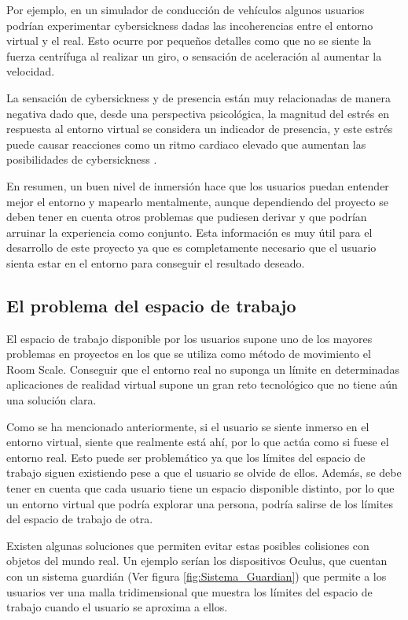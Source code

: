 \documentclass[../main.tex]{subfiles}
\begin{document}
Por ejemplo, en un simulador de conducción de vehículos algunos usuarios podrían experimentar cybersickness dadas las incoherencias entre el entorno virtual y el real. Esto ocurre por pequeños detalles como que no se siente la fuerza centrífuga al realizar un giro, o sensación de aceleración al aumentar la velocidad.

La sensación de cybersickness y de presencia están muy relacionadas de manera negativa dado que, desde una perspectiva psicológica, la magnitud del estrés en respuesta al entorno virtual se considera un indicador de presencia, y este estrés puede causar reacciones como un ritmo cardiaco elevado que aumentan las posibilidades de cybersickness \cite{Cybersickness}.

En resumen, un buen nivel de inmersión hace que los usuarios puedan entender mejor el entorno y mapearlo mentalmente, aunque dependiendo del proyecto se deben tener en cuenta otros problemas que pudiesen derivar y que podrían arruinar la experiencia como conjunto. Esta información es muy útil para el desarrollo de este proyecto ya que es completamente necesario que el usuario sienta estar en el entorno para conseguir el resultado deseado. 

\subsection{El problema del espacio de trabajo} \label{Workspace_Problem}

El espacio de trabajo disponible por los usuarios supone uno de los mayores problemas en proyectos en los que se utiliza como método de movimiento el Room Scale. Conseguir que el entorno real no suponga un límite en determinadas aplicaciones de realidad virtual supone un gran reto tecnológico que no tiene aún una solución clara.

Como se ha mencionado anteriormente, si el usuario se siente inmerso en el entorno virtual, siente que realmente está ahí, por lo que actúa como si fuese el entorno real. Esto puede ser problemático ya que los límites del espacio de trabajo siguen existiendo pese a que el usuario se olvide de ellos. Además, se debe tener en cuenta que cada usuario tiene un espacio disponible distinto, por lo que un entorno virtual que podría explorar una persona, podría salirse de los límites del espacio de trabajo de otra.

Existen algunas soluciones que permiten evitar estas posibles colisiones con objetos del mundo real. Un ejemplo serían los dispositivos Oculus, que cuentan con un sistema guardián (Ver figura \ref{fig:Sistema_Guardian}) que permite a los usuarios ver una malla tridimensional que muestra los límites del espacio de trabajo cuando el usuario se aproxima a ellos.
\end{document}
